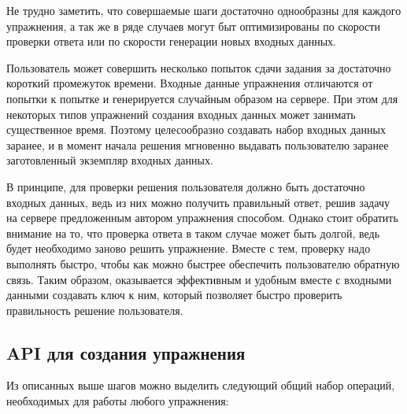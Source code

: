 \documentclass{matmex-diploma-custom}
\begin{document}
Не трудно заметить, что совершаемые шаги достаточно однообразны для
каждого упражнения, а так же в ряде случаев могут быт оптимизированы
по скорости проверки ответа или по скорости генерации новых входных
данных.

Пользователь может совершить несколько попыток сдачи задания за
достаточно короткий промежуток времени. Входные данные упражнения
отличаются от попытки к попытке и генерируется случайным образом на
сервере. При этом для некоторых типов упражнений создания входных
данных может занимать существенное время. Поэтому целесообразно
создавать набор входных данных заранее, и в момент начала решения
мгновенно выдавать пользователю заранее заготовленный экземпляр
входных данных.

В принципе, для проверки решения пользователя должно быть достаточно
входных данных, ведь из них можно получить правильный ответ, решив
задачу на сервере предложенным автором упражнения способом. Однако
стоит обратить внимание на то, что проверка ответа в таком случае
может быть долгой, ведь будет необходимо заново решить
упражнение. Вместе с тем, проверку надо выполнять быстро, чтобы как
можно быстрее обеспечить пользователю обратную связь. Таким образом,
оказывается эффективным и удобным вместе с входными данными создавать
ключ к ним, который позволяет быстро проверить правильность решение
пользователя.

\subsection{API для создания упражнения}
Из описанных выше шагов можно выделить следующий общий набор операций,
необходимых для работы любого упражнения:
\end{document}
